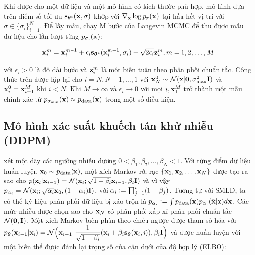 \documentclass{article} %
\begin{document}
Khi được cho một dữ liệu và một mô hình có kích thước phù hợp, mô hình dựa trên điểm số tối ưu $\bold{s}_{\boldsymbol{\theta}^{\ast}}(\bold{x}, \sigma)$ khớp với $\nabla_{\bold{x}} \log p_{\sigma}(\bold{x})$ tại hầu hết vị trí với $\sigma \in \lbrace \sigma_i \rbrace_{i=1}^N$.
Để lấy mẫu, \citep{song2019generative} chạy M bước của Langevin MCMC để thu được mẫu dữ liệu cho lần lượt từng $p_{\sigma_i}(\bold{x})$:

\begin{equation}
    \bold{x}_i^m = \bold{x}_i^{m-1} + \epsilon_i \bold{s}_{\boldsymbol{\theta}^{\ast}} (\bold{x}_i^{m-1}, \sigma_i) + \sqrt{2 \epsilon_i} \bold{z}_i^m, m = 1, 2, \dots, M
\end{equation}

với $\epsilon_i > 0$ là độ dài bước và $\bold{z}_i^m$ là một biến tuân theo phân phối chuẩn tắc.
Công thức trên được lặp lại cho $i=N, N-1, \dots, 1$ với $\bold{x}_N^0 \sim \mathcal{N}(\bold{x} \vert \bold{0}, \sigma_{\max}^2 \bold{I})$ và $\bold{x}_i^0 = \bold{x}_{i+1}^M$ khi $i < N$. Khi $M \rightarrow \infty$ và $\epsilon_i \rightarrow 0$ với mọi $i, \bold{x}_1^M$ trở thành một mẫu chính xác từ $p_{\sigma_{\min}}(\bold{x})\approx p_{\mathrm{data}}(\bold{x})$ trong một số điều kiện.


\subsection{Mô hình xác suất khuếch tán khử nhiễu (DDPM)}

\citep{sohl2015deep,ho2020denoising} xét một dãy các ngưỡng nhiễu dương $0 < \beta_1, \beta_2, \dots, \beta_N < 1$.
Với từng điểm dữ liệu huấn luyện $\bold{x}_0 \sim p_{\mathrm{data}}(\bold{x})$, một xích Markov rời rạc $\lbrace \bold{x}_1, \bold{x}_2, \dots, \bold{x}_N \rbrace$ được tạo ra sao cho $p(\bold{x}_i \vert \bold{x}_{i-1}) = \mathcal{N}(\bold{x}_i; \sqrt{1-\beta_i} \bold{x}_{i-1}, \beta_i \bold{I})$ và vì vậy $p_{\alpha_i}=\mathcal{N}(\bold{x}_i; \sqrt{\alpha_i}\bold{x}_0, (1-\alpha_i)\bold{I})$,
với $\alpha_i \vcentcolon = \prod_{j=1}^i (1 - \beta_j)$.
Tương tự với SMLD, ta có thể ký hiệu phân phối dữ liệu bị xáo trộn là $p_{\alpha_i}\vcentcolon =  \int p_{\mathrm{data}}(\bold{x}) p_{\alpha_i}(\tilde{\bold{x}} \vert \bold{x}) d \bold{x}$.
Các mức nhiễu được chọn sao cho $\bold{x}_N$ có phân phối xấp xỉ phân phối chuẩn tắc $\mathcal{N}(\bold{0}, \bold{I})$.
Một xích Markov biến phân theo chiều ngược được tham số hóa với $p_{\boldsymbol{\theta}} (\bold{x}_{i-1} \vert \bold{x}_i)=\mathcal{N}\Big(\bold{x}_{i-1}; \dfrac{1}{\sqrt{1-\beta_i}}(\bold{x}_i + \beta_i \bold{s}_{\boldsymbol{\theta}}(\bold{x}_i, i)), \beta_i \bold{I}\Big)$ và được huấn luyện với một biến thể được đánh lại trọng số của cận dưới của độ hợp lý (ELBO):
\end{document}
